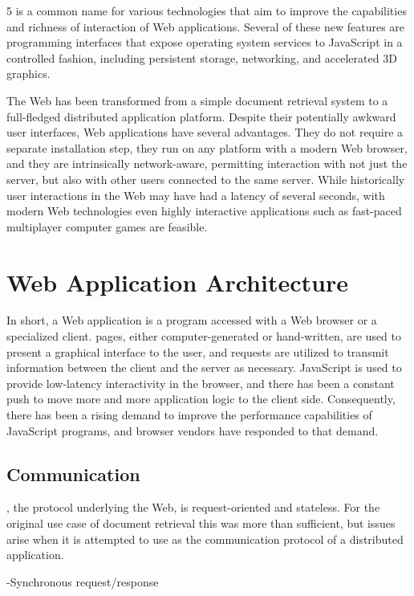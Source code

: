  5 is a common name for various technologies that aim to improve the capabilities and richness of interaction of Web applications. Several of these new features are programming interfaces that expose operating system services to JavaScript in a controlled fashion, including persistent storage, networking, and accelerated 3D graphics. \cite{HTML5}

The Web has been transformed from a simple document retrieval system to a full-fledged distributed application platform. Despite their potentially awkward user interfaces, Web applications have several advantages. They do not require a separate installation step, they run on any platform with a modern Web browser, and they are intrinsically network-aware, permitting interaction with not just the server, but also with other users connected to the same server. While historically user interactions in the Web may have had a latency of several seconds, with modern Web technologies even highly interactive applications such as fast-paced multiplayer computer games are feasible.

\section{Web Application Architecture}

In short, a Web application is a program accessed with a Web browser or a specialized  client.  pages, either computer-generated or hand-written, are used to present a graphical interface to the user, and  requests are utilized to transmit information between the client and the server as necessary. JavaScript is used to provide low-latency interactivity in the browser, and there has been a constant push to move more and more application logic to the client side. Consequently, there has been a rising demand to improve the performance capabilities of JavaScript programs, and browser vendors have responded to that demand.

\subsection{Communication}

, the protocol underlying the Web, is request-oriented and stateless. For the original use case of document retrieval this was more than sufficient, but issues arise when it is attempted to use as the communication protocol of a distributed application.

-Synchronous request/response

